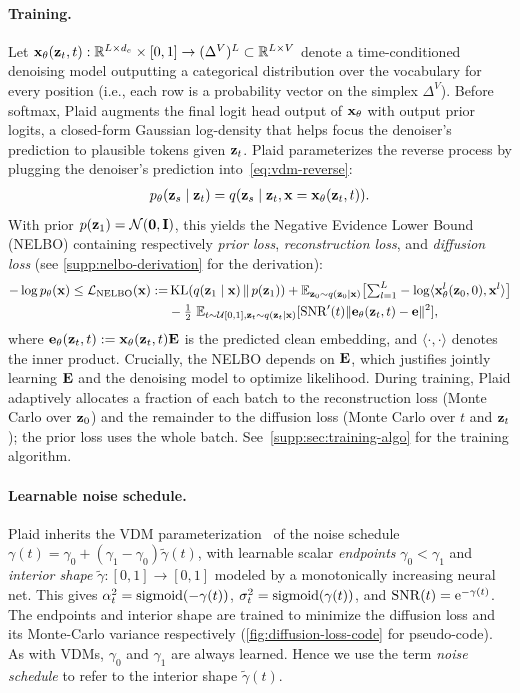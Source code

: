 \documentclass{article}
\begin{document}
\paragraph{Training.} Let ${\mathbf x}_\theta({\mathbf z}_t, t): \mathbb{R}^{L\times d_e} \times [0,1] \rightarrow (\Delta^{V})^L\subset\mathbb{R}^{L\times V}$ denote a time-conditioned denoising model outputting a categorical distribution over the vocabulary for every position (i.e., each row is a probability vector on the simplex $\Delta^V$). Before softmax, Plaid augments the final logit head output of ${\mathbf x}_\theta$ with output prior logits, a closed-form Gaussian log-density that helps focus the denoiser's prediction to plausible tokens given ${\mathbf z}_t$. Plaid parameterizes the reverse process by plugging the denoiser's prediction into~\cref{eq:vdm-reverse}:
%
\begin{align}\label{eqn:denoising}
    p_\theta({\mathbf z}_s\mid{\mathbf z}_t) = q({\mathbf z}_s\mid{\mathbf z}_t, {\mathbf x} = {\mathbf x}_\theta({\mathbf z}_t, t)).
\end{align}
%
With prior $p({\mathbf z}_1)=\mathcal{N}({\mathbf 0},{\mathbf I})$, this yields the Negative Evidence Lower Bound (NELBO) containing respectively \textit{prior loss}, \textit{reconstruction loss}, and \textit{diffusion loss} (see \cref{supp:nelbo-derivation} for the derivation):
%
\begin{align}
-\log p_\theta({\mathbf x}) \leq \mathcal{L}_{\mathrm{NELBO}}({\mathbf x}):=&\operatorname{KL}(q({\mathbf z}_1 \mid {\mathbf x}) \,\|\, p({\mathbf z}_1)) + \mathbb{E}_{{\mathbf z}_0 \sim q({\mathbf z}_0 \mid {\mathbf x})}\big[{\textstyle\sum}_{l=1}^L- \log \langle {\mathbf x}_\theta^l({\mathbf z}_0, 0), {\mathbf x}^l \rangle\big] \nonumber\\
& -\tfrac{1}{2}\ \mathbb{E}_{t\sim\mathcal{U}[0,1], {\mathbf z}_t\sim q({\mathbf z}_t \mid {\mathbf x})}[{\mathrm{SNR}}'(t) \| {\mathbf e}_\theta({\mathbf z}_t, t) - {\mathbf e} \|^2], \label{eq:plaid-nelbo}
\end{align}
%
where ${\mathbf e}_\theta({\mathbf z}_t, t):={\mathbf x}_\theta({\mathbf z}_t, t) {\mathbf E}$ is the predicted clean embedding, and $\langle\cdot,\cdot\rangle$ denotes the inner product. Crucially, the NELBO depends on ${\mathbf E}$, which justifies jointly learning ${\mathbf E}$ and the denoising model to optimize likelihood. During training, Plaid adaptively allocates a fraction of each batch to the reconstruction loss (Monte Carlo over ${\mathbf z}_0$) and the remainder to the diffusion loss (Monte Carlo over $t$ and ${\mathbf z}_t$); the prior loss uses the whole batch. See~\cref{supp:sec:training-algo} for the training algorithm.

\paragraph{Learnable noise schedule.} Plaid inherits the VDM parameterization~\citep{kingma2021variational} of the noise schedule $\gamma(t)=\gamma_0+(\gamma_1-\gamma_0)\tilde{\gamma}(t)$, with learnable scalar \textit{endpoints} $\gamma_0<\gamma_1$ and \textit{interior shape} $\tilde{\gamma}:[0,1]\rightarrow[0,1]$ modeled by a monotonically increasing neural net. This gives $\alpha^2_t = \operatorname{sigmoid}(-\gamma(t))$, $\sigma^2_t = \operatorname{sigmoid}(\gamma(t))$, and ${\mathrm{SNR}}(t) = {\mathrm{e}}^{-\gamma(t)}$. The endpoints and interior shape are trained to minimize the diffusion loss and its Monte-Carlo variance respectively (\cref{fig:diffusion-loss-code} for pseudo-code). As with VDMs, $\gamma_0$ and $\gamma_1$ are always learned. Hence we use the term \textit{noise schedule} to refer to the interior shape $\tilde\gamma(t)$.
\end{document}
